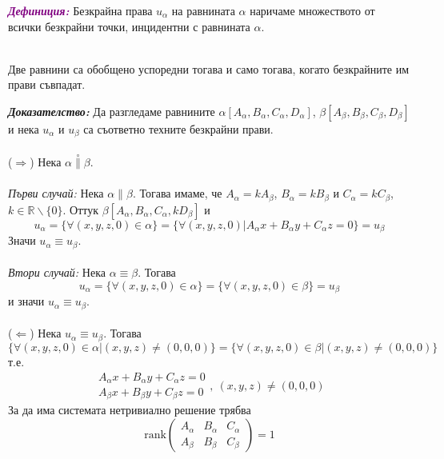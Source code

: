 \documentclass[12pt]{article}
\begin{document}
\textbf{\textit{\textcolor{purple}{Дефиниция:}}} Безкрайна права $u_\alpha$ на равнината $\alpha$ наричаме множеството от всички безкрайни точки, инцидентни с равнината $\alpha$.
\\
\\
\begin{tcolorbox}[
    colback=blue!5,    %
    colframe=blue!75!black, %
    title={\textbf{Твърдение 5:}}, %
    fonttitle=\bfseries,
    boxrule=0.8pt,
    arc=1mm,           %
    top=2mm, bottom=2mm, left=3mm, right=3mm
]  Две равнини са обобщено успоредни тогава и само тогава, когато безкрайните им прави съвпадат. 
\end{tcolorbox}
\textbf{\textit{Доказателство:}} Да разгледаме равнините $\alpha[A_\alpha,B_\alpha,C_\alpha,D_\alpha]$, $\beta[A_\beta, B_\beta, C_\beta, D_\beta]$ и нека $u_{\alpha}$ и $u_{\beta}$ са съответно техните безкрайни прави. \\
\\
($\Rightarrow$) Нека $\alpha\overset{\circ}{\parallel}\beta$.\\
\\
\textit{Първи случай:} Нека $\alpha\parallel \beta$. Тогава имаме, че $A_\alpha=kA_\beta$, $B_\alpha=kB_\beta$ и $C_\alpha=kC_\beta$, $k\in\mathbb{R}\backslash\{0\}$. Оттук $\beta[A_\alpha,B_\alpha,C_\alpha,kD_\beta]$ и $$u_{\alpha}=\{\forall(x,y,z,0)\in\alpha\}=\{\forall(x,y,z,0)|A_\alpha x+B_\alpha y+C_\alpha z = 0\}=u_\beta$$ Значи $u_\alpha\equiv u_\beta$.
\\
\\
\textit{Втори случай:} Нека $\alpha\equiv\beta$. Тогава $$u_\alpha=\{\forall(x,y,z,0)\in\alpha\}=\{\forall(x,y,z,0)\in\beta\}=u_\beta$$ и значи $u_\alpha\equiv u_\beta$.
\\
\\
($\Leftarrow$) Нека $u_\alpha\equiv u_\beta$. Тогава $$\{\forall(x,y,z,0)\in\alpha|(x,y,z)\neq(0,0,0)\}=\{\forall(x,y,z,0)\in\beta|(x,y,z)\neq(0,0,0)\}$$ т.е. $$\begin{array}{|l}A_\alpha x+B_\alpha y+C_\alpha z=0 \\ A_\beta x+B_\beta y+C_\beta z=0\end{array},\ (x,y,z)\neq(0,0,0)$$ За да има системата нетривиално решение трябва $$\mathrm{rank}\begin{pmatrix} A_\alpha & B_\alpha & C_\alpha \\ A_\beta & B_\beta & C_\beta\end{pmatrix}=1$$ \\ 
\end{document}
